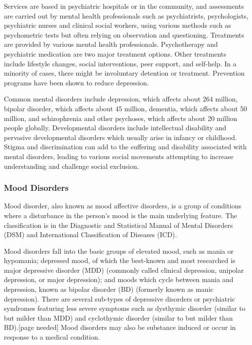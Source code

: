 Services are based in psychiatric hospitals or in the community, and
assessments are carried out by mental health professionals such as
psychiatrists, psychologists, psychiatric nurses and clinical social
workers, using various methods such as psychometric tests but often
relying on observation and questioning. Treatments are provided by
various mental health professionals. Psychotherapy and psychiatric
medication are two major treatment options. Other treatments include
lifestyle changes, social interventions, peer support, and self-help. In
a minority of cases, there might be involuntary detention or treatment.
Prevention programs have been shown to reduce depression.

Common mental disorders include depression, which affects about 264
million, bipolar disorder, which affects about 45 million, dementia,
which affects about 50 million, and schizophrenia and other psychoses,
which affects about 20 million people globally. Developmental disorders
include intellectual disability and pervasive developmental disorders
which usually arise in infancy or childhood. Stigma and discrimination
can add to the suffering and disability associated with mental
disorders, leading to various social movements attempting to increase
understanding and challenge social exclusion.

\hypertarget{mood-disorders}{%
\subsubsection{Mood Disorders}\label{mood-disorders}}

Mood disorder, also known as mood affective disorders, is a group of
conditions where a disturbance in the person's mood is the main
underlying feature. The classification is in the Diagnostic and
Statistical Manual of Mental Disorders (DSM) and International
Classification of Diseases (ICD).

Mood disorders fall into the basic groups of elevated mood, such as
mania or hypomania; depressed mood, of which the best-known and most
researched is major depressive disorder (MDD) (commonly called clinical
depression, unipolar depression, or major depression); and moods which
cycle between mania and depression, known as bipolar disorder (BD)
(formerly known as manic depression). There are several sub-types of
depressive disorders or psychiatric syndromes featuring less severe
symptoms such as dysthymic disorder (similar to but milder than MDD) and
cyclothymic disorder (similar to but milder than BD).{[}page needed{]}
Mood disorders may also be substance induced or occur in response to a
medical condition.

